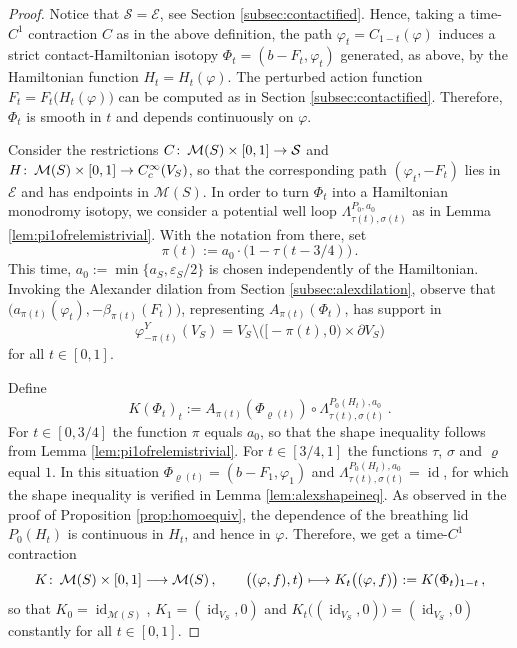 \documentclass{amsart}
\theoremstyle{definition}
\def\co{\colon\thinspace}
\newcommand{\EE}{\mathcal E}
\newcommand{\MM}{\mathcal M}
\renewcommand{\SS}{\mathcal S}
\newcommand{\lra}{\longrightarrow}
\newcommand{\ra}{\rightarrow}
\DeclareMathOperator{\id}{\mathrm{id}}
\begin{document}
\begin{proof}
Notice that $\SS=\EE$,
see Section \ref{subsec:contactified}.
Hence,
taking a time-$C^1$ contraction $C$
as in the above definition,
the path $\varphi_t=C_{1-t}(\varphi)$
induces a strict contact-Hamiltonian isotopy
$\Phi_t=(b-F_t,\varphi_t)$
generated, as above, by the Hamiltonian function
$H_t=H_t(\varphi)$.
The perturbed action function
$F_t=F_t\big(H_t(\varphi)\big)$
can be computed as in Section \ref{subsec:contactified}.
Therefore,
$\Phi_t$ is smooth in $t$ and
depends continuously on $\varphi$.

Consider the restrictions
$C\co\MM(S)\times[0,1]\ra\SS$
and
$H\co\MM(S)\times[0,1]\ra C_c^{\infty}(V_S)$,
so that the corresponding path
$(\varphi_t,-F_t)$ lies in $\EE$
and has endpoints in $\MM(S)$.
In order to turn $\Phi_t$ into a
Hamiltonian monodromy isotopy,
we consider a potential well loop
$\Lambda_{\tau(t),\sigma(t)}^{P_0,a_0}$
as in Lemma \ref{lem:pi1ofrelemistrivial}.
With the notation from there,
set
\[
\pi(t):=
a_0
\cdot
\big(1-\tau(t-3/4)\big)
\,.
\]
This time,
$a_0:=\min\big\{a_S,\varepsilon_S/2\big\}$
is chosen independently of the Hamiltonian.  
Invoking the Alexander dilation from
Section \ref{subsec:alexdilation},
observe that $\big(a_{\pi(t)}(\varphi_t),-\beta_{\pi(t)}(F_t)\big)$,
representing $A_{\pi(t)}(\Phi_t)$,
has support in
\[
\varphi^Y_{-\pi(t)}(V_S)=
V_S\setminus\Big(\big[-\pi(t),0\big)\times\partial V_S\Big)
\]
for all $t\in[0,1]$.

Define
\[
K(\Phi_t)_t:=
A_{\pi(t)}(\Phi_{\varrho(t)})\circ
\Lambda_{\tau(t),\sigma(t)}^{P_0(H_t),a_0}
\,.
\]
For $t\in[0,3/4]$ the function $\pi$ equals $a_0$,
so that the shape inequality follows from
Lemma \ref{lem:pi1ofrelemistrivial}.
For $t\in[3/4,1]$ the functions $\tau$, $\sigma$ and $\varrho$
equal $1$.
In this situation
$\Phi_{\varrho(t)}=(b-F_1,\varphi_1)$
and
$\Lambda_{\tau(t),\sigma(t)}^{P_0(H_t),a_0}=\id$,
for which the shape inequality is verified
in Lemma \ref{lem:alexshapeineq}.
As observed in the proof of
Proposition \ref{prop:homoequiv},
the dependence of the breathing lid $P_0(H_t)$
is continuous in $H_t$,
and hence in $\varphi$.
Therefore,
we get a time-$C^1$ contraction
\[
K\co
\MM(S)\times[0,1]\lra\MM(S)
\,,
\qquad
\big((\varphi,f),t\big)\longmapsto
K_t\big((\varphi,f)\big):=K(\Phi_t)_{1-t}
\,,
\]
so that $K_0=\id_{\MM(S)}$,
$K_1=(\id_{V_S},0)$ and
$K_t\big((\id_{V_S},0)\big)=(\id_{V_S},0)$
constantly for all $t\in[0,1]$.
\end{proof}


\end{document}
